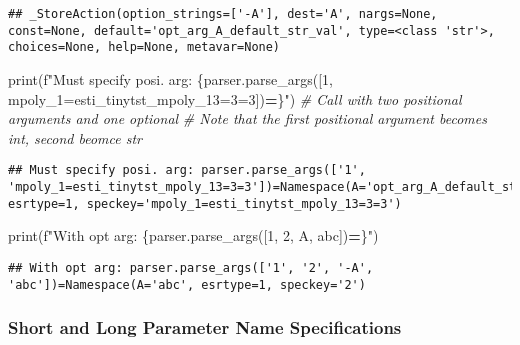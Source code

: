 \documentclass[
]{book}
\newenvironment{Shaded}{\begin{snugshade}}{\end{snugshade}}
\newcommand{\BuiltInTok}[1]{#1}
\newcommand{\CommentTok}[1]{\textcolor[rgb]{0.56,0.35,0.01}{\textit{#1}}}
\newcommand{\NormalTok}[1]{#1}
\newcommand{\OperatorTok}[1]{\textcolor[rgb]{0.81,0.36,0.00}{\textbf{#1}}}
\newcommand{\SpecialCharTok}[1]{\textcolor[rgb]{0.00,0.00,0.00}{#1}}
\newcommand{\SpecialStringTok}[1]{\textcolor[rgb]{0.31,0.60,0.02}{#1}}
\newcommand{\StringTok}[1]{\textcolor[rgb]{0.31,0.60,0.02}{#1}}
\begin{document}
\begin{verbatim}
## _StoreAction(option_strings=['-A'], dest='A', nargs=None, const=None, default='opt_arg_A_default_str_val', type=<class 'str'>, choices=None, help=None, metavar=None)
\end{verbatim}

\begin{Shaded}
\begin{Highlighting}[]
\BuiltInTok{print}\NormalTok{(}\SpecialStringTok{f"Must specify posi. arg: }\SpecialCharTok{\{}\NormalTok{parser}\SpecialCharTok{.}\NormalTok{parse\_args([}\StringTok{\textquotesingle{}1\textquotesingle{}}\NormalTok{, }\StringTok{\textquotesingle{}mpoly\_1=esti\_tinytst\_mpoly\_13=3=3\textquotesingle{}}\NormalTok{])}\OperatorTok{=}\SpecialCharTok{\}}\SpecialStringTok{"}\NormalTok{)}
\CommentTok{\# Call with two positional arguments and one optional}
\CommentTok{\# Note that the first positional argument becomes int, second beomce str}
\end{Highlighting}
\end{Shaded}

\begin{verbatim}
## Must specify posi. arg: parser.parse_args(['1', 'mpoly_1=esti_tinytst_mpoly_13=3=3'])=Namespace(A='opt_arg_A_default_str_val', esrtype=1, speckey='mpoly_1=esti_tinytst_mpoly_13=3=3')
\end{verbatim}

\begin{Shaded}
\begin{Highlighting}[]
\BuiltInTok{print}\NormalTok{(}\SpecialStringTok{f"With opt arg: }\SpecialCharTok{\{}\NormalTok{parser}\SpecialCharTok{.}\NormalTok{parse\_args([}\StringTok{\textquotesingle{}1\textquotesingle{}}\NormalTok{, }\StringTok{\textquotesingle{}2\textquotesingle{}}\NormalTok{, }\StringTok{\textquotesingle{}{-}A\textquotesingle{}}\NormalTok{, }\StringTok{\textquotesingle{}abc\textquotesingle{}}\NormalTok{])}\OperatorTok{=}\SpecialCharTok{\}}\SpecialStringTok{"}\NormalTok{)}
\end{Highlighting}
\end{Shaded}

\begin{verbatim}
## With opt arg: parser.parse_args(['1', '2', '-A', 'abc'])=Namespace(A='abc', esrtype=1, speckey='2')
\end{verbatim}

\hypertarget{short-and-long-parameter-name-specifications}{%
\subsubsection{Short and Long Parameter Name Specifications}\label{short-and-long-parameter-name-specifications}}
\end{document}

